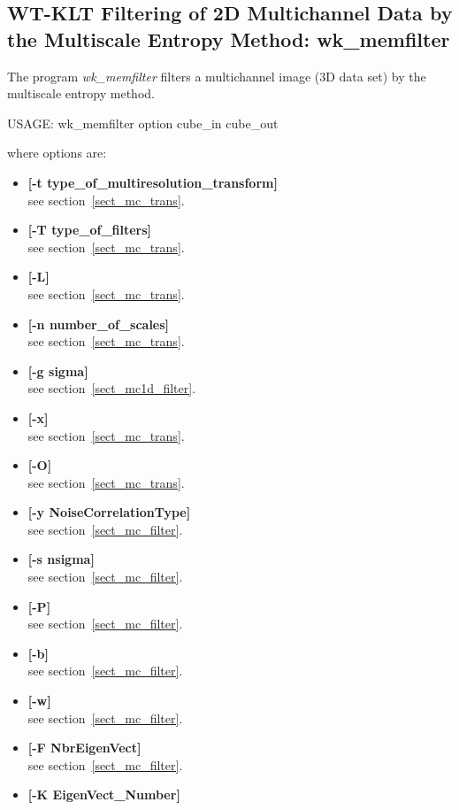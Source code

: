 \subsection{WT-KLT Filtering of 2D Multichannel Data by the Multiscale
Entropy Method: wk\_memfilter}
The program 
{\em wk\_memfilter} filters 
a multichannel image (3D data set) by the multiscale entropy method.
{\bf
\begin{center}
 USAGE: wk\_memfilter option cube\_in cube\_out
\end{center}}
where options are: 
\begin{itemize} 
\baselineskip=0.4truecm
\itemsep=0.1truecm
\item {\bf [-t type\_of\_multiresolution\_transform]} \\
see section~\ref{sect_mc_trans}.
\item {\bf [-T type\_of\_filters]}  \\ 
see section~\ref{sect_mc_trans}.
\item {\bf [-L]} \\
see section~\ref{sect_mc_trans}.    
\item {\bf [-n number\_of\_scales]} \\
see section~\ref{sect_mc_trans}.  
\item {\bf [-g sigma]}\\
see section~\ref{sect_mc1d_filter}.
\item {\bf [-x]} \\
see section~\ref{sect_mc_trans}.  
\item {\bf [-O]} \\
see section~\ref{sect_mc_trans}.  
\item {\bf [-y NoiseCorrelationType]} \\
see section~\ref{sect_mc_filter}.  
\item {\bf [-s nsigma]} \\
see section~\ref{sect_mc_filter}.  
\item {\bf [-P]} \\
see section~\ref{sect_mc_filter}.  
\item {\bf [-b]} \\
see section~\ref{sect_mc_filter}.  
\item {\bf [-w]} \\
see section~\ref{sect_mc_filter}.  
\item {\bf [-F NbrEigenVect]} \\
see section~\ref{sect_mc_filter}.  
\item {\bf [-K EigenVect\_Number]} \\

\end{itemize}
